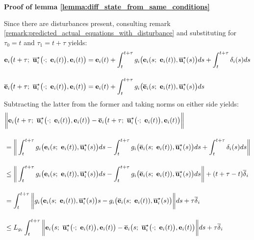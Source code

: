 \begin{gg_box}
\textbf{Proof of lemma \eqref{lemma:diff_state_from_same_conditions}}

Since there are disturbances present, consulting remark
\eqref{remark:predicted_actual_equations_with_disturbance} and substituting
for $\tau_0 = t$ and $\tau_1 = t + \tau$ yields:
\begin{align}
  \vect{e}_i\big(t + \tau;\ \overline{\vect{u}}_i^{\star}\big(\cdot;\ \vect{e}_i(t)\big), \vect{e}_i(t)\big) &=
    \vect{e}_i(t)
    + \int_{t}^{t + \tau} g_i\big(\vect{e}_i(s;\ \vect{e}_i(t)), \overline{\vect{u}}_i^{\star}(s)\big) ds
    + \int_{t}^{t + \tau}\delta_i(s)ds\\[2.5ex]
  \overline{\vect{e}}_i\big(t + \tau;\ \overline{\vect{u}}_i^{\star}\big(\cdot;\ \vect{e}_i(t)\big), \vect{e}_i(t)\big) &=
    \vect{e}_i(t) + \int_{t}^{t + \tau} g_i\big(\overline{\vect{e}}_i(s;\ \vect{e}_i(t)), \overline{\vect{u}}_i^{\star}(s)\big) ds
\end{align}
Subtracting the latter from the former and taking norms on either side yields:
\begin{align}
  &\bigg\| \vect{e}_i\big(t + \tau;\ \overline{\vect{u}}_i^{\star}\big(\cdot;\ \vect{e}_i(t)\big), \vect{e}_i(t)\big) -
  \overline{\vect{e}}_i\big(t + \tau;\ \overline{\vect{u}}_i^{\star}\big(\cdot;\ \vect{e}_i(t)\big), \vect{e}_i(t)\big) \bigg\| \\[2.5ex]
  &=\bigg\| \int_{t}^{t + \tau} g_i\big(\vect{e}_i(s;\ \vect{e}_i(t)), \overline{\vect{u}}_i^{\star}(s)\big) ds
     - \int_{t}^{t + \tau} g_i\big(\overline{\vect{e}}_i(s;\ \vect{e}_i(t)), \overline{\vect{u}}_i^{\star}(s)\big) ds
    + \int_{t}^{t + \tau}\delta_i(s)ds \bigg\| \\[2.5ex]
  & \leq \bigg\| \int_{t}^{t + \tau} g_i\big(\vect{e}_i(s;\ \vect{e}_i(t)), \overline{\vect{u}}_i^{\star}(s)\big) ds
     - \int_{t}^{t + \tau} g_i\big(\overline{\vect{e}}_i(s;\ \vect{e}_i(t)), \overline{\vect{u}}_i^{\star}(s)\big) ds \bigg\|
     + (t + \tau - t)\overline{\delta}_i \\[2.5ex]
  &=
     \int_{t}^{t + \tau} \bigg\| g_i\big(\vect{e}_i(s;\ \vect{e}_i(t)), \overline{\vect{u}}_i^{\star}(s)\big)s
     - g_i\big(\overline{\vect{e}}_i(s;\ \vect{e}_i(t)), \overline{\vect{u}}_i^{\star}(s)\big) \bigg\| ds + \tau \overline{\delta}_i\\[2.5ex]
  &\leq L_{g_i} \int_{t}^{t + \tau} \bigg\| \vect{e}_i\big(s;\ \overline{\vect{u}}_i^{\star}\big(\cdot;\ \vect{e}_i(t)\big), \vect{e}_i(t)\big) -
  \overline{\vect{e}}_i\big(s;\ \overline{\vect{u}}_i^{\star}\big(\cdot;\ \vect{e}_i(t)\big), \vect{e}_i(t)\big) \bigg\| ds + \tau \overline{\delta}_i  \\[2.5ex]

\end{align}
\end{gg_box}
